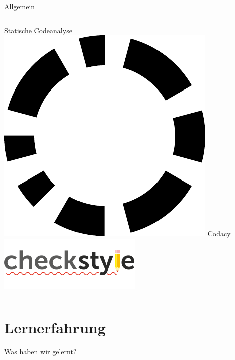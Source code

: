 \documentclass[xcolor=dvipsnames]{beamer}
\begin{document}
\begin{frame}{Allgemein}
\begin{columns}
\begin{column}{0.3\textwidth}
\begin{block}{Statische Codeanalyse}
                        \includegraphics[width=(\textwidth / 4)]{img/codacy.pdf}
                        Codacy\\
                        \includegraphics[width=(\textwidth / 2)]{img/checkstyle.png}
                    \end{block}
                \end{column}
        \end{columns}
    \end{frame}

    \section{Lernerfahrung}
    \begin{frame}
        \begin{center}
            \Huge Was haben wir gelernt?
        \end{center}
    \end{frame}
\end{document}
